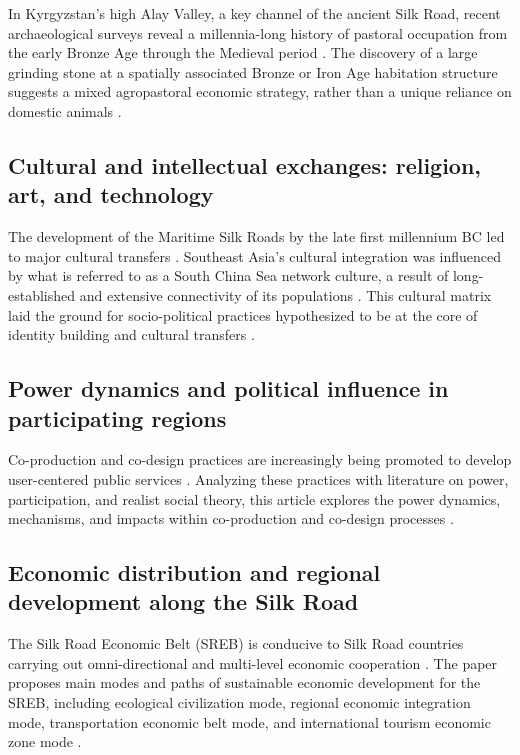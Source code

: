 \documentclass{article}
\begin{document}
In Kyrgyzstan's high Alay Valley, a key channel of the ancient Silk Road, recent archaeological surveys reveal a millennia-long history of pastoral occupation from the early Bronze Age through the Medieval period \cite{Taylor2018EarlyPE}. The discovery of a large grinding stone at a spatially associated Bronze or Iron Age habitation structure suggests a mixed agropastoral economic strategy, rather than a unique reliance on domestic animals \cite{Taylor2018EarlyPE}.

\subsection{Cultural and intellectual exchanges: religion, art, and technology}

The development of the Maritime Silk Roads by the late first millennium BC led to major cultural transfers \cite{Bellina2014MaritimeSR}. Southeast Asia's cultural integration was influenced by what is referred to as a South China Sea network culture, a result of long-established and extensive connectivity of its populations \cite{Bellina2014MaritimeSR}. This cultural matrix laid the ground for socio-political practices hypothesized to be at the core of identity building and cultural transfers \cite{Bellina2014MaritimeSR}.

\subsection{Power dynamics and political influence in participating regions}

Co-production and co-design practices are increasingly being promoted to develop user-centered public services \cite{Farr2018PowerDA}. Analyzing these practices with literature on power, participation, and realist social theory, this article explores the power dynamics, mechanisms, and impacts within co-production and co-design processes \cite{Farr2018PowerDA}.

\subsection{Economic distribution and regional development along the Silk Road}

The Silk Road Economic Belt (SREB) is conducive to Silk Road countries carrying out omni-directional and multi-level economic cooperation \cite{Suocheng2015ResourcesEA}. The paper proposes main modes and paths of sustainable economic development for the SREB, including ecological civilization mode, regional economic integration mode, transportation economic belt mode, and international tourism economic zone mode \cite{Suocheng2015ResourcesEA}.
\end{document}
